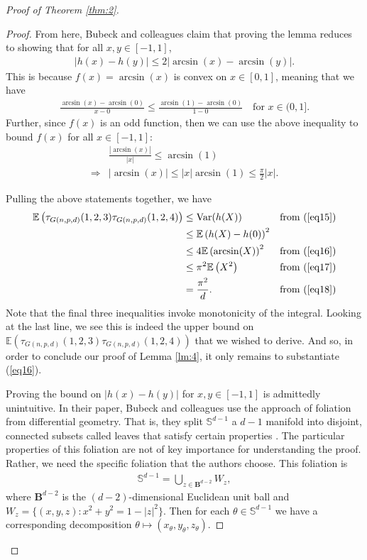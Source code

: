 \documentclass{article}
\begin{document}
\begin{proof}[Proof of Theorem \ref{thm:2}]
\begin{proof}
From here, Bubeck and colleagues claim that proving the lemma reduces to showing that for all $x, y \in [-1, 1]$,
\begin{align}
    \left| h(x) - h(y) \right| \leq 2 \left|\arcsin(x) - \arcsin(y) \right|\label{eq16}.
\end{align}
This is because $f(x) = \arcsin(x)$ is convex on $x \in [0, 1]$, meaning that we have
\begin{align*}
    \frac{\arcsin(x) - \arcsin(0)}{x - 0}  \leq \frac{\arcsin(1) - \arcsin(0)}{1 - 0} \quad \text{for $x \in (0,1]$}.
\end{align*}
Further, since $f(x)$ is an odd function, then we can use the above inequality to bound $f(x)$ for all $x \in [-1, 1]$:
\begin{align}
    &\frac{\left| \arcsin(x) \right|}{ \left| x \right|}  \leq \arcsin(1) \nonumber\\
    \Rightarrow &\left| \arcsin(x) \right| \leq \left| x \right| \arcsin(1) \leq \frac{\pi}{2} \left| x \right|\label{eq17}.
\end{align}


Pulling the above statements together, we have
\begin{align*}
    \mathbb{E}\left( \tau_{G(n,p,d)}(1,2,3)\tau_{G(n,p,d)}(1,2,4) \right) &\leq \text{Var}(h(X)) & \text{from (\ref{eq15})}\\
    &\leq \mathbb{E} \left( h(X) - h(0) \right)^2\\
    &\leq 4 \mathbb{E} \left( \arcsin(X) \right)^2 & \text{from (\ref{eq16})}\\
    &\leq \pi^2 \mathbb{E}\left(X^2 \right)  & \text{from (\ref{eq17})}\\
    &= \frac{\pi^2}{d}. & \text{from (\ref{eq18})}
\end{align*}
Note that the final three inequalities invoke monotonicity of the integral. Looking at the last line, we see this is indeed the upper bound on $ \mathbb{E}\left( \tau_{G(n,p,d)}(1,2,3)\tau_{G(n,p,d)}(1,2,4) \right)$ that we wished to derive. And so, in order to conclude our proof of Lemma \ref{lm:4}, it only remains to substantiate (\ref{eq16}). 

Proving the bound on $\left|h(x) - h(y) \right|$ for $x, y \in [-1, 1]$ is admittedly unintuitive. In their paper, Bubeck and colleagues use the approach of foliation from differential geometry. That is, they split $\mathbb{S}^{d-1}$ a $d-1$ manifold into disjoint, connected subsets called leaves that satisfy certain properties \cite{lawson1971codimension}. The particular properties of this foliation are not of key importance for understanding the proof. Rather, we need the specific foliation that the authors choose. This foliation is 
\begin{align}
    \mathbb{S}^{d-1} = \bigcup\limits_{z \in \boldsymbol{B}^{d-2}} W_z\label{eq19},
\end{align}
where $\boldsymbol{B}^{d-2}$ is the $(d-2)$-dimensional Euclidean unit ball and $W_z = \{(x, y, z) : x^2 + y^2 = 1- \left| z \right|^2 \}$. Then for each $\theta \in \mathbb{S}^{d-1}$ we have a corresponding decomposition $\theta \mapsto (x_{\theta}, y_{\theta}, z_{\theta})$. 


\end{proof}
\end{proof}
\end{document}
